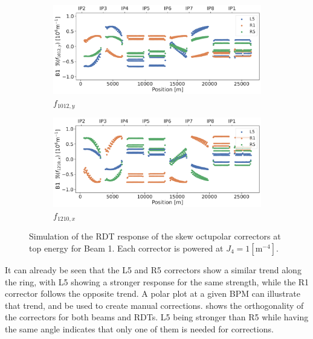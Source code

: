 \begin{figure}[!htb]
    \centering
    \begin{subfigure}{0.8\textwidth}
        \includegraphics[width=\textwidth]{./images/f1012_b1_correctors.pdf}
        \caption{$f_{1012,y}$}
    \end{subfigure}
    \par\bigskip 
    \begin{subfigure}{0.8\textwidth}
        \includegraphics[width=\textwidth]{./images/f1210_b1_correctors.pdf}
        \caption{$f_{1210,x}$}
    \end{subfigure}
    \caption{Simulation of the RDT response of the skew octupolar correctors at top energy for Beam
    1. Each corrector is powered at $J_4 = 1 [\text{m}^{-4}]$.}
    \label{fig:skew_octupolar:response_correctors}
\end{figure}

It can already be seen that the L5 and R5 correctors show a similar trend along the ring, with L5
showing a stronger response for the same strength, while the R1 corrector follows the opposite
trend. A polar plot at a given BPM can illustrate that trend, and be used to create manual
corrections.  shows the orthogonality of the
correctors for both beams and RDTs. L5 being stronger than R5 while having the same angle indicates
that only one of them is needed for corrections.


